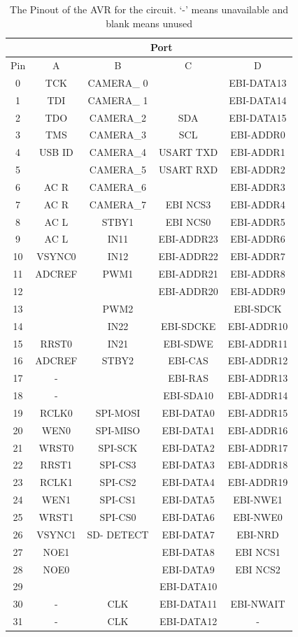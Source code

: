 \begin{table}
\centering
\caption{The Pinout of the AVR for the circuit. `-' means unavailable and blank means unused}
\label{table:UC3C:Pinout}
\begin{tabular}{|c|c|c|c|c|}\cline{2-5}
\multicolumn{1}{c|}{ } & \multicolumn{4}{|c|}{Port} \\ \hline
Pin & A & B & C & D \\ \hline
0&TCK&CAMERA\_ 0&&EBI-DATA13\\
1&TDI&CAMERA\_ 1&&EBI-DATA14\\
2&TDO&CAMERA\_2&SDA&EBI-DATA15\\
3&TMS&CAMERA\_3&SCL&EBI-ADDR0\\
4&USB ID&CAMERA\_4&USART TXD&EBI-ADDR1\\
5&&CAMERA\_5&USART RXD&EBI-ADDR2\\
6&AC R&CAMERA\_6&&EBI-ADDR3\\
7&AC R&CAMERA\_7&EBI NCS3&EBI-ADDR4\\
8&AC L&STBY1&EBI NCS0&EBI-ADDR5\\
9&AC L&IN11&EBI-ADDR23&EBI-ADDR6\\
10&VSYNC0&IN12&EBI-ADDR22&EBI-ADDR7\\
11&ADCREF&PWM1&EBI-ADDR21&EBI-ADDR8\\
12&&&EBI-ADDR20&EBI-ADDR9\\
13&&PWM2&&EBI-SDCK\\
14&&IN22&EBI-SDCKE&EBI-ADDR10\\
15&RRST0&IN21&EBI-SDWE&EBI-ADDR11\\
16&ADCREF&STBY2&EBI-CAS&EBI-ADDR12\\
17&-&&EBI-RAS&EBI-ADDR13\\
18&-&&EBI-SDA10&EBI-ADDR14\\
19&RCLK0&SPI-MOSI&EBI-DATA0&EBI-ADDR15\\
20&WEN0&SPI-MISO&EBI-DATA1&EBI-ADDR16\\
21&WRST0&SPI-SCK&EBI-DATA2&EBI-ADDR17\\
22&RRST1&SPI-CS3&EBI-DATA3&EBI-ADDR18\\
23&RCLK1&SPI-CS2&EBI-DATA4&EBI-ADDR19\\
24&WEN1&SPI-CS1&EBI-DATA5&EBI-NWE1\\
25&WRST1&SPI-CS0&EBI-DATA6&EBI-NWE0\\
26&VSYNC1&SD- DETECT&EBI-DATA7&EBI-NRD\\
27&NOE1&&EBI-DATA8&EBI NCS1\\
28&NOE0&&EBI-DATA9&EBI NCS2\\
29&&&EBI-DATA10&\\
30&-&CLK&EBI-DATA11&EBI-NWAIT\\
31&-&CLK&EBI-DATA12&-\\ \hline

\end{tabular}
\end{table}

